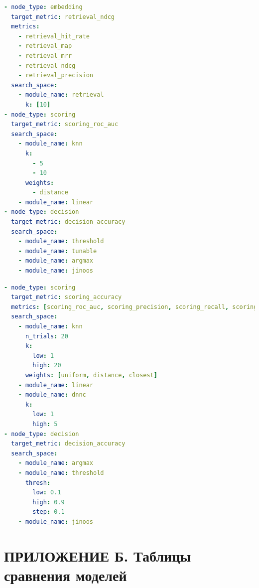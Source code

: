 \documentclass[14pt,a4paper,oneside,openany]{extbook}
\begin{document}
\begin{lstlisting}[language=yaml,label=src:encoder_config,caption={Параметры для сравнения различных моделей эмбеддинга},captionpos=b,numbers=none]
- node_type: embedding
  target_metric: retrieval_ndcg
  metrics:
    - retrieval_hit_rate
    - retrieval_map
    - retrieval_mrr
    - retrieval_ndcg
    - retrieval_precision
  search_space:
    - module_name: retrieval
      k: [10]
- node_type: scoring
  target_metric: scoring_roc_auc
  search_space:
    - module_name: knn
      k:
        - 5
        - 10
      weights:
        - distance
    - module_name: linear
- node_type: decision
  target_metric: decision_accuracy
  search_space:
    - module_name: threshold
    - module_name: tunable
    - module_name: argmax
    - module_name: jinoos
\end{lstlisting}

\begin{lstlisting}[language=yaml,label=src:few_shot_config,caption={Параметры для few-shot обучения},captionpos=b,numbers=none]
- node_type: scoring
  target_metric: scoring_accuracy
  metrics: [scoring_roc_auc, scoring_precision, scoring_recall, scoring_f1]
  search_space:
    - module_name: knn
      n_trials: 20
      k:
        low: 1
        high: 20
      weights: [uniform, distance, closest]
    - module_name: linear
    - module_name: dnnc
      k:
        low: 1
        high: 5
- node_type: decision
  target_metric: decision_accuracy
  search_space:
    - module_name: argmax
    - module_name: threshold
      thresh:
        low: 0.1
        high: 0.9
        step: 0.1
    - module_name: jinoos
\end{lstlisting}
\chapter*{ПРИЛОЖЕНИЕ Б. Таблицы сравнения моделей}
\label{sec:org3bca429}
\end{document}
